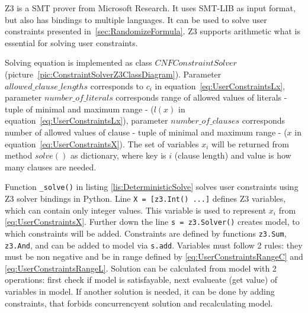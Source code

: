 Z3 \cite{Z3Solver} is a \gls{SMT} prover from Microsoft Research. It uses SMT-LIB as input format, but also has bindings to multiple languages. It can be used to solve user constraints presented in~\ref{sec:RandomizeFormula}. Z3 supports arithmetic what is essential for solving user constraints.

Solving equation is implemented as class $CNFConstraintSolver$ (picture~\ref{pic:ConstraintSolverZ3ClassDiagram}). Parameter $allowed\_clause\_lengths$ corresponds to $c_i$ in equation~\ref{eq:UserConstraintsLx}, parameter $number\_of\_literals$ corresponds range of allowed values of literals - tuple of minimal and maximum range - ($l(x)$ in equation~\ref{eq:UserConstraintsLx}), parameter $number\_of\_clauses$ corresponds number of allowed values of clause - tuple of minimal and maximum range - ($x$ in equation~\ref{eq:UserConstraintsX}). The set of variables $x_i$ will be returned from method $solve()$ as dictionary, where key is $i$ (clause length) and value is how many clauses are needed.


Function \texttt{_solve()} in listing \ref{lis:DeterministicSolve} solves user constraints using Z3 solver bindings in Python. Line 
\texttt{X = [z3.Int() ...]}
defines Z3 variables, which can contain only integer values. This variable is used to represent $x_i$ from \ref{eq:UserConstraintsX}. Further down the line 
\texttt{s = z3.Solver()} 
creates model, to which constraints will be added. Constraints are defined by functions
\texttt{z3.Sum}, 
\texttt{z3.And}, 
and can be added to model via
\texttt{s.add}.
Variables must follow 2 rules: they must be non negative and be in range defined by \ref{eq:UserConstraintsRangeC} and \ref{eq:UserConstraintsRangeL}. Solution can be calculated from model with 2 operations: first check if model is satisfayable, next evalueate (get value) of variables in model. If another solution is needed, it can be done by adding constraints, that forbids concurrencyent solution and recalculating model.


